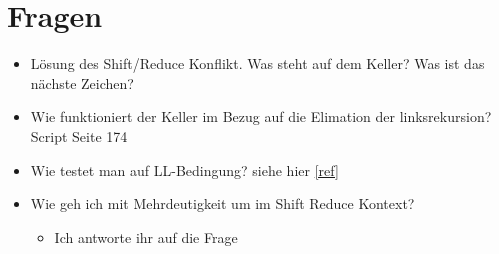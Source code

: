 \documentclass[
  ngerman
  ,12pt
  ,pdftex
]{article}
\begin{document}

\section{Fragen}
\begin{itemize}
  \item Lösung des Shift/Reduce Konflikt. Was steht auf dem Keller? Was ist das nächste Zeichen?
  \item Wie funktioniert der Keller im Bezug auf die Elimation der linksrekursion? Script Seite 174
  \item Wie testet man auf LL-Bedingung? siehe hier \ref{ref}
  \item Wie geh ich mit Mehrdeutigkeit um im Shift Reduce Kontext?
  \begin{itemize}
    \item []  Ich antworte ihr auf die Frage  
  \end{itemize}
\end{itemize}
\end{document}

